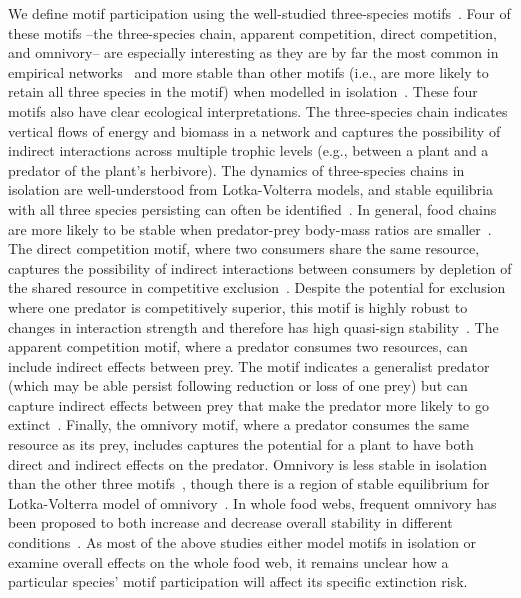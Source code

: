 \documentclass[12pt]{article}
\begin{document}
\begin{spacing}{2.0}
    We define motif participation using the well-studied three-species motifs~\citep{Milo2004,Stouffer2007,Stouffer2012,Cirtwill2015a}. 
    Four of these motifs --the three-species chain, apparent competition, direct competition, and omnivory-- are especially interesting as they are by far the most common in empirical networks~\citep{Stouffer2007, giling2019plant} and more stable than other motifs (i.e., are more likely to retain all three species in the motif) when modelled in isolation~\citep{Borrelli2015a}.
    These four motifs also have clear ecological interpretations.
    The three-species chain indicates vertical flows of energy and biomass in a network and captures the possibility of indirect interactions across multiple trophic levels (e.g., between a plant and a predator of the plant's herbivore).
    The dynamics of three-species chains in isolation are well-understood from Lotka-Volterra models, and stable equilibria with all three species persisting can often be identified~\citep{Borrelli2015a,Hsu2015}.
    In general, food chains are more likely to be stable when predator-prey body-mass ratios are smaller~\citep{Jonsson1998}.
    The direct competition motif, where two consumers share the same resource, captures the possibility of indirect interactions between consumers by depletion of the shared resource in competitive exclusion~\citep{Hsu2015}. 
    Despite the potential for exclusion where one predator is competitively superior, this motif is highly robust to changes in interaction strength and therefore has high quasi-sign stability~\citep{Borrelli2015a}.
    The apparent competition motif, where a predator consumes two resources, can include indirect effects between prey. The motif indicates a generalist predator (which may be able persist following reduction or loss of one prey) but can capture indirect effects between prey that make the predator more likely to go extinct~\citep{Melian2002}.
    Finally, the omnivory motif, where a predator consumes the same resource as its prey, includes captures the potential for a plant to have both direct and indirect effects on the predator. 
    Omnivory is less stable in isolation than the other three motifs~\citep{Borrelli2015a}, though there is a region of stable equilibrium for Lotka-Volterra model of omnivory~\citep{Hsu2015}.
    In whole food webs, frequent omnivory has been proposed to both increase and decrease overall stability in different conditions~\citep{McCann1997,Emmerson2004,Monteiro2016}.
    As most of the above studies either model motifs in isolation or examine overall effects on the whole food web, it remains unclear how a particular species' motif participation will affect its specific extinction risk.
    

\end{spacing}
\end{document}
